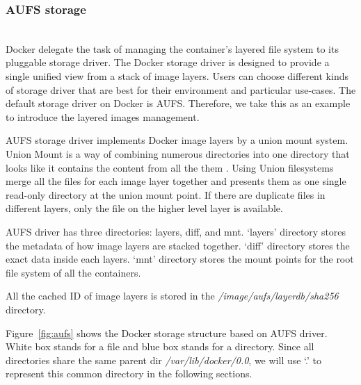 

\subsubsection{AUFS storage}~\\
Docker delegate the task of managing the container's layered file system to its pluggable storage driver. 
The Docker storage driver is designed to provide a single unified view from a stack of image layers.
Users can choose different kinds of storage driver that are best for their environment and particular use-cases. The default storage driver on Docker is AUFS. Therefore, we take this as an example to introduce the layered images management.

AUFS storage driver implements Docker image layers by a union mount system. Union Mount is a way of combining numerous directories into one directory that looks like it contains the content from all the them \cite{unionMount}. Using Union filesystems merge all the files for each image layer together and presents them as one single read-only directory at the union mount point. If there are duplicate files in different layers, only the file on the higher level layer is available.

AUFS driver has three directories: layers, diff, and mnt. `layers' directory stores the metadata of how image layers are stacked together. `diff' directory stores the exact data inside each layers. `mnt' directory stores the mount points for the root file system of all the containers. 

All the cached ID of image layers is stored in the \textit{/image/aufs/layerdb/sha256} directory.



Figure~\ref{fig:aufs} shows the Docker storage structure based on AUFS driver. White box stands for a file and blue box stands for a directory. Since all directories share the same parent dir \textit{/var/lib/docker/0.0}, we will use `.' to represent this common directory in the following sections. 

